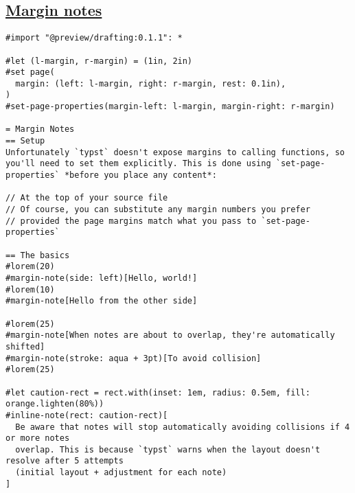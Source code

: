 \subsection{\texorpdfstring{\hyperref[margin-notes]{Margin
notes}}{Margin notes}}\label{margin-notes}

\begin{verbatim}
#import "@preview/drafting:0.1.1": *

#let (l-margin, r-margin) = (1in, 2in)
#set page(
  margin: (left: l-margin, right: r-margin, rest: 0.1in),
)
#set-page-properties(margin-left: l-margin, margin-right: r-margin)

= Margin Notes
== Setup
Unfortunately `typst` doesn't expose margins to calling functions, so you'll need to set them explicitly. This is done using `set-page-properties` *before you place any content*:

// At the top of your source file
// Of course, you can substitute any margin numbers you prefer
// provided the page margins match what you pass to `set-page-properties`

== The basics
#lorem(20)
#margin-note(side: left)[Hello, world!]
#lorem(10)
#margin-note[Hello from the other side]

#lorem(25)
#margin-note[When notes are about to overlap, they're automatically shifted]
#margin-note(stroke: aqua + 3pt)[To avoid collision]
#lorem(25)

#let caution-rect = rect.with(inset: 1em, radius: 0.5em, fill: orange.lighten(80%))
#inline-note(rect: caution-rect)[
  Be aware that notes will stop automatically avoiding collisions if 4 or more notes
  overlap. This is because `typst` warns when the layout doesn't resolve after 5 attempts
  (initial layout + adjustment for each note)
]
\end{verbatim}

\pandocbounded{}

